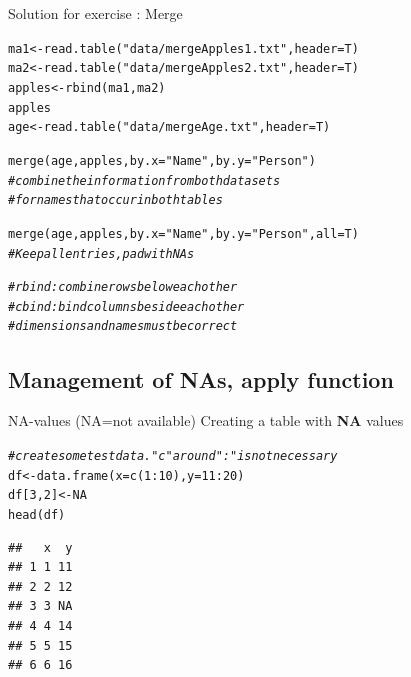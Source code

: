 \documentclass[xcolor=table,       handout,    xcolor=dvipsnames]{beamer}\usepackage[]{graphicx}\usepackage[]{color}
\makeatletter
\newcommand{\hlnum}[1]{\textcolor[rgb]{0,0,0}{#1}}
\newcommand{\hlstr}[1]{\textcolor[rgb]{0.545,0.137,0.137}{#1}}
\newcommand{\hlcom}[1]{\textcolor[rgb]{0,0.392,0}{\textit{#1}}}
\newcommand{\hlopt}[1]{\textcolor[rgb]{0,0,0}{#1}}
\newcommand{\hlstd}[1]{\textcolor[rgb]{0,0,0}{#1}}
\newcommand{\hlkwb}[1]{\textcolor[rgb]{0,0,0}{#1}}
\newcommand{\hlkwc}[1]{\textcolor[rgb]{1,0,1}{#1}}
\newcommand{\hlkwd}[1]{\textcolor[rgb]{0,0,1}{#1}}
\newenvironment{kframe}{%
 \def\at@end@of@kframe{}%
 \ifinner\ifhmode%
  \def\at@end@of@kframe{\end{minipage}}%
  \begin{minipage}{\columnwidth}%
 \fi\fi%
 \def\FrameCommand##1{\hskip\@totalleftmargin \hskip-\fboxsep
 \colorbox{shadecolor}{##1}\hskip-\fboxsep
     \hskip-\linewidth \hskip-\@totalleftmargin \hskip\columnwidth}%
 \MakeFramed {\advance\hsize-\width
   \@totalleftmargin\z@ \linewidth\hsize
   \@setminipage}}%
 {\par\unskip\endMakeFramed%
 \at@end@of@kframe}
\newenvironment{knitrout}{}{} %
\newcounter{exercisecount}
\makeatother
\begin{document}
\begin{frame}[fragile]{Solution for exercise : Merge}
\begin{knitrout}
\color{fgcolor}\begin{kframe}
\begin{alltt}
\hlstd{ma1} \hlkwb{<-} \hlkwd{read.table}\hlstd{(}\hlstr{"data/mergeApples1.txt"}\hlstd{,} \hlkwc{header}\hlstd{=T)}
\hlstd{ma2} \hlkwb{<-} \hlkwd{read.table}\hlstd{(}\hlstr{"data/mergeApples2.txt"}\hlstd{,} \hlkwc{header}\hlstd{=T)}
\hlstd{apples} \hlkwb{<-} \hlkwd{rbind}\hlstd{(ma1, ma2)}
\hlstd{apples}
\hlstd{age} \hlkwb{<-} \hlkwd{read.table}\hlstd{(}\hlstr{"data/mergeAge.txt"}\hlstd{,} \hlkwc{header}\hlstd{=T)}

\hlkwd{merge}\hlstd{(age, apples,} \hlkwc{by.x}\hlstd{=}\hlstr{"Name"}\hlstd{,} \hlkwc{by.y}\hlstd{=}\hlstr{"Person"}\hlstd{)}
\hlcom{# combine the information from both datasets}
\hlcom{# for names that occur in both tables}

\hlkwd{merge}\hlstd{(age, apples,} \hlkwc{by.x}\hlstd{=}\hlstr{"Name"}\hlstd{,} \hlkwc{by.y}\hlstd{=}\hlstr{"Person"}\hlstd{,} \hlkwc{all}\hlstd{=T)}
\hlcom{# Keep all entries, pad with NAs}

\hlcom{# rbind: combine rows below each other}
\hlcom{# cbind: bind columns beside each other}
\hlcom{# dimensions and names must be correct}
\end{alltt}
\end{kframe}
\end{knitrout}
\end{frame}

\subsection{Management of NAs, apply function}

\begin{frame}[fragile]{NA-values (NA=not available)}
Creating a table with \textbf{NA} values
\begin{knitrout}
\color{fgcolor}\begin{kframe}
\begin{alltt}
\hlcom{# create some test data. "c" around ":" is not necessary}
\hlstd{df} \hlkwb{<-} \hlkwd{data.frame}\hlstd{(}\hlkwc{x}\hlstd{=} \hlkwd{c}\hlstd{(}\hlnum{1}\hlopt{:}\hlnum{10}\hlstd{),} \hlkwc{y}\hlstd{=}\hlnum{11}\hlopt{:}\hlnum{20} \hlstd{)}
\hlstd{df[}\hlnum{3}\hlstd{,}\hlnum{2}\hlstd{]} \hlkwb{<-} \hlnum{NA}
\hlkwd{head}\hlstd{(df)}
\end{alltt}
\begin{verbatim}
##   x  y
## 1 1 11
## 2 2 12
## 3 3 NA
## 4 4 14
## 5 5 15
## 6 6 16
\end{verbatim}
\end{kframe}
\end{knitrout}
\end{frame}
\end{document}
